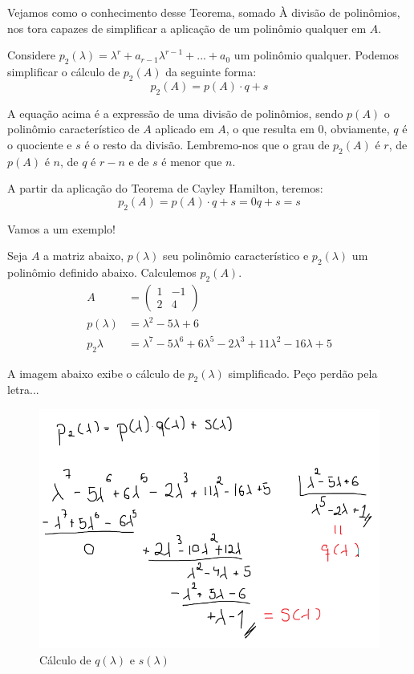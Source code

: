 \documentclass[12pt]{article}
\begin{document}
Vejamos como o conhecimento desse Teorema, somado À divisão de polinômios, nos tora capazes de simplificar a aplicação de um polinômio qualquer em $A$.

Considere $p_2(\lambda)=\lambda^r+a_{r-1}\lambda^{r-1}+...+a_0$ um polinômio qualquer. Podemos simplificar o cálculo de $p_2(A)$ da seguinte forma:
\begin{equation*}
	p_2(A)=p(A)\cdot q+ s
\end{equation*}

A equação acima é a expressão de uma divisão de polinômios, sendo $p(A)$ o polinômio característico de $A$ aplicado em $A$, o que resulta em 0, obviamente, $q$ é o quociente e $s$ é o resto da divisão. Lembremo-nos que o grau de $p_2(A)$ é $r$, de $p(A)$ é $n$, de $q$ é $r-n$ e de $s$ é menor que $n$.

A partir da aplicação do Teorema de Cayley Hamilton, teremos:
\begin{equation*}
	p_2(A)=p(A)\cdot q+ s=0q+s=s
\end{equation*}


Vamos a um exemplo!

Seja $A$ a matriz abaixo, $p(\lambda)$ seu polinômio característico e $p_2(\lambda)$ um polinômio definido abaixo. Calculemos $p_2(A)$.
\begin{align*}
	A&=\begin{pmatrix}
		1&-1\\
		2&4
	\end{pmatrix}\\
	p(\lambda)&=\lambda^2-5\lambda+6\\
	p_2{\lambda}&=\lambda^7-5\lambda^6+6\lambda^5-2\lambda^3+11\lambda^2-16\lambda+5
\end{align*}

A imagem abaixo exibe o cálculo de $p_2(\lambda)$ simplificado. Peço perdão pela letra...

\begin{figure}[H]
	\centering
	\includegraphics[width=1\linewidth]{Imagens/aplicacao2}
	\caption{Cálculo de $q(\lambda)$ e $s(\lambda)$}
	\label{fig:aplicacao2}
\end{figure}
\end{document}
